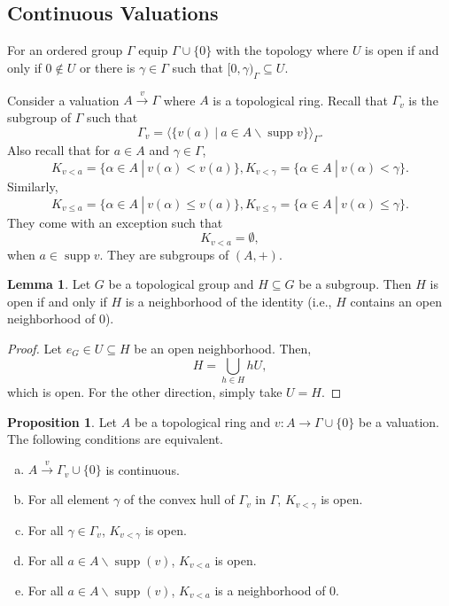 \documentclass[10pt]{article}
\numberwithin{equation}{section}
\theoremstyle{definition}
\newtheorem{proposition}{Proposition}[subsection]
\newtheorem{lemma}{Lemma}[subsection]
\DeclareMathOperator{\supp}{supp}
\newcommand{\sep}[0]{\:|\:}
\begin{document}
\subsection{Continuous Valuations}
For an ordered group $\Gamma$ equip $\Gamma\cup\{0\}$ with the topology where $U$ is open if and only if $0\not\in U$ or there is $\gamma\in\Gamma$ such that $[0,\gamma)_\Gamma\subseteq U$.
\par Consider a valuation $A\stackrel{v}{\to}\Gamma$ where $A$ is a topological ring. Recall that $\Gamma_v$ is the subgroup of $\Gamma$ such that
\begin{equation*}
    \Gamma_v = \langle\{v(a)\sep a\in A\backslash\supp v\}\rangle_\Gamma.
\end{equation*}
Also recall that for $a\in A$ and $\gamma\in \Gamma$,
\begin{equation*}
    K_{v<a} = \{\alpha\in A\sep v(\alpha)<v(a)\},K_{v<\gamma} = \{\alpha\in A\sep v(\alpha)<\gamma\}.
\end{equation*}
Similarly,
\begin{equation*}
    K_{v\leq a} = \{\alpha\in A\sep v(\alpha)\leq v(a)\},K_{v\leq\gamma} = \{\alpha\in A\sep v(\alpha)\leq\gamma\}.
\end{equation*}
They come with an exception such that
\begin{equation*}
    K_{v<a}= \emptyset,
\end{equation*}
when $a\in\supp v$. They are subgroups of $(A,+)$.
\begin{lemma}
    \label{lemma_fact_12_1}
    Let $G$ be a topological group and $H\subseteq G$ be a subgroup. Then $H$ is open if and only if $H$ is a neighborhood of the identity (i.e., $H$ contains an open neighborhood of $0$).
\end{lemma}
\begin{proof}
    Let $e_G\in U\subseteq H$ be an open neighborhood. Then,
    \begin{equation*}
        H = \bigcup_{h\in H}hU,
    \end{equation*}
    which is open. For the other direction, simply take $U=H$.
\end{proof}
\begin{proposition}
    \label{fact_12_1}
    Let $A$ be a topological ring and $v:A\to\Gamma\cup\{0\}$ be a valuation. The following conditions are equivalent.
    \begin{enumerate}[a.]
        \item $A\stackrel{v}{\to}\Gamma_v\cup\{0\}$ is continuous.
        \item For all element $\gamma$ of the convex hull of $\Gamma_v$ in $\Gamma$, $K_{v<\gamma}$ is open.
        \item For all $\gamma\in\Gamma_v$, $K_{v<\gamma}$ is open.
        \item For all $a\in A\backslash\supp(v)$, $K_{v<a}$ is open.
        \item For all $a\in A\backslash\supp(v)$, $K_{v<a}$ is a neighborhood of $0$.
    \end{enumerate}
\end{proposition}
\end{document}

